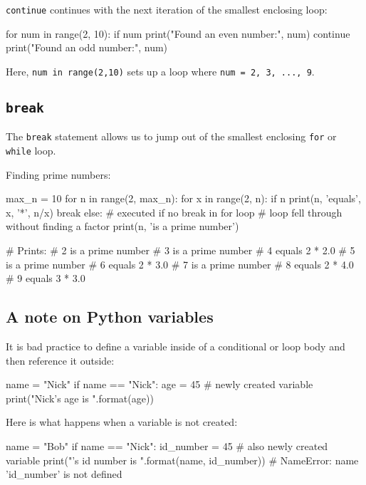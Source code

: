 \documentclass[12pt]{article} \newif\ifsolution\solutiontrue %
\begin{document}
\texttt{continue} continues with the next iteration of the smallest
enclosing loop:

\begin{python}
for num in range(2, 10):
    if num %
        print("Found an even number:", num)
        continue
    print("Found an odd number:", num)
\end{python}

Here, \texttt{num\ in\ range(2,10)} sets up a loop where
\texttt{num\ =\ 2,\ 3,\ ...,\ 9}.

\subsection{\texorpdfstring{\texttt{break}}{break}}\label{break}

The \texttt{break} statement allows us to jump out of the smallest
enclosing \texttt{for} or \texttt{while} loop.

Finding prime numbers:

\begin{python}
max_n = 10
for n in range(2, max_n):
    for x in range(2, n):
        if n %
            print(n, 'equals', x, '*', n/x)
            break
    else: # executed if no break in for loop
        # loop fell through without finding a factor
        print(n, 'is a prime number')
        
# Prints:
# 2 is a prime number
# 3 is a prime number
# 4 equals 2 * 2.0
# 5 is a prime number
# 6 equals 2 * 3.0
# 7 is a prime number
# 8 equals 2 * 4.0
# 9 equals 3 * 3.0
\end{python}

\subsection{A note on Python
variables}\label{a-note-on-python-variables}

It is bad practice to define a variable inside of a conditional or loop
body and then reference it outside:

\begin{python}
name = "Nick"
if name == "Nick":
    age = 45 # newly created variable
print("Nick's age is {}".format(age))
\end{python}

Here is what happens when a variable is not created:

\begin{python}
name = "Bob"
if name == "Nick":
    id_number = 45 # also newly created variable
print("{}'s id number is {}".format(name, id_number))
# NameError: name 'id_number' is not defined
\end{python}
\end{document}
